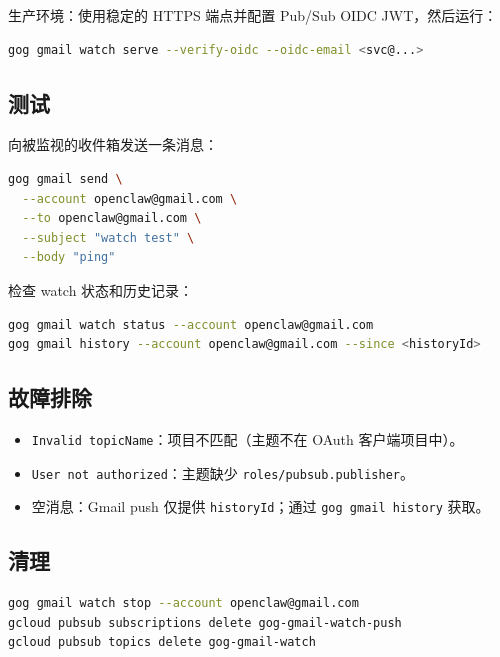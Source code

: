 生产环境：使用稳定的 HTTPS 端点并配置 Pub/Sub OIDC JWT，然后运行：

\begin{lstlisting}[language=bash]
gog gmail watch serve --verify-oidc --oidc-email <svc@...>
\end{lstlisting}


\subsection{测试}


向被监视的收件箱发送一条消息：

\begin{lstlisting}[language=bash]
gog gmail send \
  --account openclaw@gmail.com \
  --to openclaw@gmail.com \
  --subject "watch test" \
  --body "ping"
\end{lstlisting}


检查 watch 状态和历史记录：

\begin{lstlisting}[language=bash]
gog gmail watch status --account openclaw@gmail.com
gog gmail history --account openclaw@gmail.com --since <historyId>
\end{lstlisting}


\subsection{故障排除}


\begin{itemize}
  \item \texttt{Invalid topicName}：项目不匹配（主题不在 OAuth 客户端项目中）。
  \item \texttt{User not authorized}：主题缺少 \texttt{roles/pubsub.publisher}。
  \item 空消息：Gmail push 仅提供 \texttt{historyId}；通过 \texttt{gog gmail history} 获取。
\end{itemize}


\subsection{清理}


\begin{lstlisting}[language=bash]
gog gmail watch stop --account openclaw@gmail.com
gcloud pubsub subscriptions delete gog-gmail-watch-push
gcloud pubsub topics delete gog-gmail-watch
\end{lstlisting}




